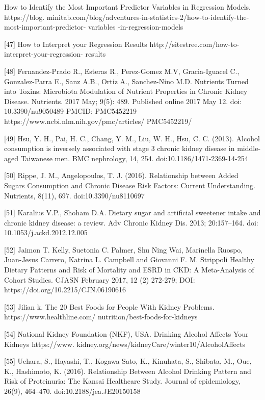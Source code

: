 \begin{flushleft}
[46]	How to Identify the Most Important Predictor Variables in Regression Models. https://blog.
minitab.com/blog/adventures-in-statistics-2/how-to-identify-the-most-important-predictor- variables
-in-regression-models

[47]	How to Interpret your Regression Results http://sitestree.com/how-to-interpret-your-regression-
results

[48]  Fernandez-Prado R., Esteras R., Perez-Gomez M.V, Gracia-Iguacel C., Gonzalez-Parra E.,  Sanz 
A.B., Ortiz A., Sanchez-Nino M.D. Nutrients Turned into Toxins: Microbiota Modulation of Nutrient 
Properties in Chronic Kidney Disease. Nutrients. 2017 May; 9(5): 489. Published online 2017 May 12. 
doi: 10.3390/nu9050489 PMCID: PMC5452219 https://www.ncbi.nlm.nih.gov/pmc/articles/
PMC5452219/

[49]  Hsu, Y. H., Pai, H. C., Chang, Y. M., Liu, W. H.,  Hsu, C. C. (2013). Alcohol consumption is inversely associated with stage 3 chronic kidney disease in middle-aged Taiwanese men. BMC nephrology, 14, 254. doi:10.1186/1471-2369-14-254

[50]  Rippe, J. M.,  Angelopoulos, T. J. (2016). Relationship between Added Sugars Consumption and Chronic Disease Risk Factors: Current Understanding. Nutrients, 8(11), 697. doi:10.3390/nu8110697

[51]  Karalius V.P., Shoham D.A. Dietary sugar and artificial sweetener intake and chronic kidney disease: a review. Adv Chronic Kidney Dis. 2013; 20:157–164. doi: 10.1053/j.ackd.2012.12.005

[52] Jaimon T. Kelly, Suetonia C. Palmer, Shu Ning Wai, Marinella Ruospo, Juan-Jesus Carrero, Katrina L. Campbell and Giovanni F. M. Strippoli Healthy Dietary Patterns and Risk of Mortality and ESRD in CKD: A Meta-Analysis of Cohort Studies. CJASN February 2017, 12 (2) 272-279; DOI: https://doi.org/10.2215/CJN.06190616 

[53]  Jilian k. The 20 Best Foods for People With Kidney Problems. https://www.healthline.com/
nutrition/best-foods-for-kidneys

[54]  National Kidney Foundation (NKF), USA. Drinking Alcohol Affects Your Kidneys https://www.
kidney.org/news/kidneyCare/winter10/AlcoholAffects

[55]  Uehara, S., Hayashi, T., Kogawa Sato, K., Kinuhata, S., Shibata, M., Oue, K., Hashimoto, K. (2016). Relationship Between Alcohol Drinking Pattern and Risk of Proteinuria: The Kansai Healthcare Study. Journal of epidemiology, 26(9), 464–470. doi:10.2188/jea.JE20150158


\end{flushleft}
